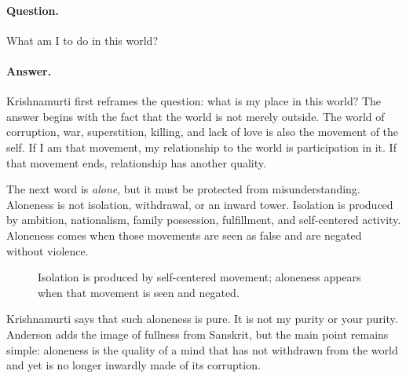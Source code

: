 \paragraph{Question.}
What am I to do in this world?

\paragraph{Answer.}
Krishnamurti first reframes the question: what is my place in this world? The answer begins with the fact that the world is not merely outside. The world of corruption, war, superstition, killing, and lack of love is also the movement of the self. If I am that movement, my relationship to the world is participation in it. If that movement ends, relationship has another quality.

The next word is \emph{alone}, but it must be protected from misunderstanding. Aloneness is not isolation, withdrawal, or an inward tower. Isolation is produced by ambition, nationalism, family possession, fulfillment, and self-centered activity. Aloneness comes when those movements are seen as false and are negated without violence.

\begin{figure}
\centering
{}
\caption{Isolation is produced by self-centered movement; aloneness appears when that movement is seen and negated.}
\end{figure}

Krishnamurti says that such aloneness is pure. It is not my purity or your purity. Anderson adds the image of fullness from Sanskrit, but the main point remains simple: aloneness is the quality of a mind that has not withdrawn from the world and yet is no longer inwardly made of its corruption.


